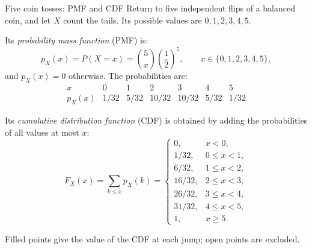 \documentclass[a4paper,12pt,oneside]{report}
\begin{document}
\clearpage
\begin{framedexample}{Five coin tosses: PMF and CDF}
Return to five independent flips of a balanced coin, and let $X$
count the tails. Its possible values are $0,1,2,3,4,5$.

Its \emph{probability mass function} (PMF) is:
\[
  p_X(x)=P(X=x)=\binom5x\left(\frac12\right)^5,
  \qquad x\in\{0,1,2,3,4,5\},
\]
and $p_X(x)=0$ otherwise. The probabilities are:
\[
  \begin{array}{c|cccccc}
    x & 0 & 1 & 2 & 3 & 4 & 5\\
    \hline
    p_X(x) & 1/32 & 5/32 & 10/32 & 10/32 & 5/32 & 1/32
  \end{array}
\]

Its \emph{cumulative distribution function} (CDF) is obtained by
adding the probabilities of all values at most $x$:
\[
  F_X(x)=\sum_{k\leq x}p_X(k)=
  \begin{cases}
    0, & x<0,\\
    1/32, & 0\leq x<1,\\
    6/32, & 1\leq x<2,\\
    16/32, & 2\leq x<3,\\
    26/32, & 3\leq x<4,\\
    31/32, & 4\leq x<5,\\
    1, & x\geq5.
  \end{cases}
\]

\begin{center}

{\small Filled points give the value of the CDF at each jump;
open points are excluded.}
\end{center}


\end{framedexample}
\end{document}
